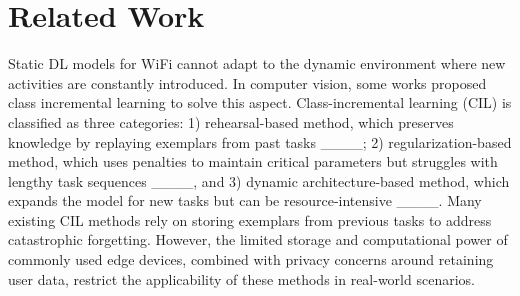 \section{Related Work}

Static DL models for WiFi cannot adapt to the dynamic environment where new activities are constantly introduced.
In computer vision, some works proposed class incremental learning to solve this aspect.
Class-incremental learning (CIL) is classified as three categories: 1) rehearsal-based method, which preserves knowledge by replaying exemplars from past tasks ____; 2) regularization-based method, which uses penalties to maintain critical parameters but struggles with lengthy task sequences ____, and 3) dynamic architecture-based method, which expands the model for new tasks but can be resource-intensive ____. 
Many existing CIL methods rely on storing exemplars from previous tasks to address catastrophic forgetting. However, the limited storage and computational power of commonly used edge devices, combined with privacy concerns around retaining user data, restrict the applicability of these methods in real-world scenarios.

